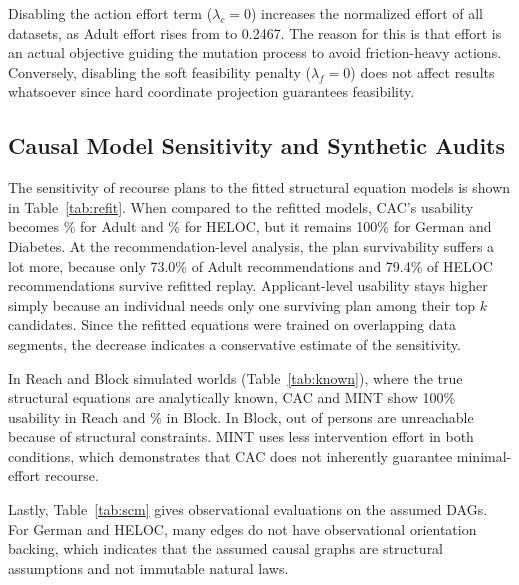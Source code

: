 \documentclass[nolineno]{paper/ieee-access/ieeeaccess}%
\newcommand{\CAC}{CAC}
\begin{document}
Disabling the action effort term ($\lambda_c=0$) increases the normalized effort of all datasets, as Adult effort rises from \AdultCacCost{} to 0.2467. The reason for this is that effort is an actual objective guiding the mutation process to avoid friction-heavy actions. Conversely, disabling the soft feasibility penalty ($\lambda_f=0$) does not affect results whatsoever since hard coordinate projection guarantees feasibility.

\begin{table}[t]
\caption{Component ablation analysis of the \CAC{} objective function at seed 42. Usability ($U$) and action effort ($C$) are evaluated across causal propagation, action cost, and feasibility penalty ablations.}
\label{tab:ablation}
\centering\footnotesize\setlength{\tabcolsep}{3pt}

\end{table}

\subsection{Causal Model Sensitivity and Synthetic Audits}
The sensitivity of recourse plans to the fitted structural equation models is shown in Table~\ref{tab:refit}. When compared to the refitted models, \CAC{}'s usability becomes \AdultRefitUsable\% for Adult and \HelocRefitUsable\% for HELOC, but it remains 100\% for German and Diabetes. At the recommendation-level analysis, the plan survivability suffers a lot more, because only 73.0\% of Adult recommendations and 79.4\% of HELOC recommendations survive refitted replay. Applicant-level usability stays higher simply because an individual needs only one surviving plan among their top $k$ candidates. Since the refitted equations were trained on overlapping data segments, the decrease indicates a conservative estimate of the sensitivity.

In Reach and Block simulated worlds (Table~\ref{tab:known}), where the true structural equations are analytically known, \CAC{} and MINT show 100\% usability in Reach and \BlockCacUsable\% in Block. In Block, \BlockUnreachable{} out of \BlockApplicants{} persons are unreachable because of structural constraints. MINT uses less intervention effort in both conditions, which demonstrates that \CAC{} does not inherently guarantee minimal-effort recourse.

Lastly, Table~\ref{tab:scm} gives observational evaluations on the assumed DAGs. For German and HELOC, many edges do not have observational orientation backing, which indicates that the assumed causal graphs are structural assumptions and not immutable natural laws.
\end{document}
